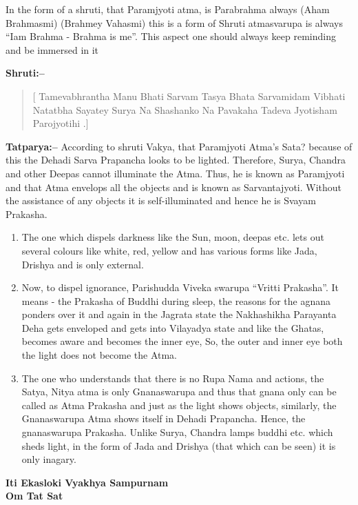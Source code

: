 In the form of a shruti, that Paramjyoti atma, is Parabrahma always (Aham Brahmasmi) (Brahmey Vahasmi) this is a form of Shruti atmasvarupa is always “Iam Brahma - Brahma is me”. This aspect one should always keep reminding and be immersed in it 

\textbf{Shruti:–}

\begin{verse}
[ Tamevabhrantha Manu Bhati Sarvam  Tasya Bhata Sarva\break midam Vibhati  Natatbha Sayatey Surya Na Shashanko Na Pavakaha  Tadeva Jyotisham Parojyotihi .]
\end{verse}

\textbf{Tatparya:–} According to shruti Vakya, that Paramjyoti Atma's Sata? because of this the Dehadi Sarva Prapancha looks to be lighted. Therefore, Surya, Chandra and other Deepas cannot illuminate the Atma. Thus, he is known as Paramjyoti and that Atma envelops all the objects and is known as Sarvantajyoti. Without the assistance of any objects it is self-illuminated and hence he is Svayam Prakasha.

\begin{enumerate}
\item The one which dispels darkness like the Sun, moon, deepas etc. lets out several colours like white, red, yellow and has various forms like Jada, Drishya and is only external.

 \item Now, to dispel ignorance, Parishudda Viveka swarupa “Vritti Prakasha”. It means - the Prakasha of Buddhi during sleep, the reasons for the agnana ponders over it and again in the Jagrata state the Nakhashikha Parayanta Deha gets enveloped and gets into Vilayadya state and like the Ghatas, becomes aware and becomes the inner eye, So, the outer and inner eye both the light does not become the Atma.

 \item The one who understands that there is no Rupa Nama and actions, the Satya, Nitya atma is only Gnanaswarupa and thus that gnana only can be called as Atma Prakasha and just as the light shows objects, similarly, the Gnanaswarupa Atma shows itself in Dehadi Prapancha. Hence, the gnanaswarupa Prakasha. Unlike Surya, Chandra lamps buddhi etc. which sheds light, in the form of Jada and Drishya (that which can be seen) it is only inagary.

\end{enumerate}

\begin{center}
\textbf{Iti Ekasloki Vyakhya Sampurnam\\ Om Tat Sat}
\end{center}

